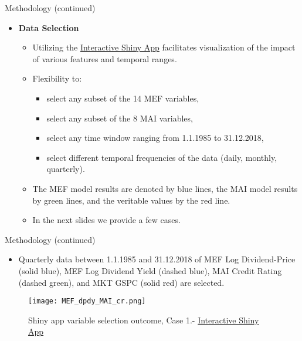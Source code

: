 \documentclass{beamer}
\begin{document}
\begin{frame}{Methodology (continued)}
  \begin{itemize}
    \item \textbf{Data Selection}
    \begin{itemize}
        \item Utilizing the \href{https://baumender11.shinyapps.io/Alpha/}{Interactive Shiny App} facilitates visualization of the impact of various features and temporal ranges.
        \item Flexibility to:
        \begin{itemize}
            \item select any subset of the 14 MEF variables,
            \item select any subset of the 8 MAI variables,
            \item select any time window ranging from 1.1.1985 to 31.12.2018,
            \item select different temporal frequencies of the data (daily, monthly, quarterly).
        \end{itemize}
        \item The MEF model results are denoted by blue lines, the MAI model results by green lines, and the veritable values by the red line.
        \item In the next slides we provide a few cases.
    \end{itemize}
  \end{itemize}
\end{frame}

\begin{frame}{Methodology (continued)}
  \begin{itemize}
    \item Quarterly data between 1.1.1985 and 31.12.2018 of MEF Log Dividend-Price (solid blue), MEF Log Dividend Yield (dashed blue), MAI Credit Rating (dashed green), and MKT GSPC (solid red) are selected.
  \end{itemize}
    \begin{figure}[H]
        \centering
        \begin{minipage}{.80\textwidth}
            \centering
            \texttt{[image: MEF\_dpdy\_MAI\_cr.png]}
            \caption{Shiny app variable selection outcome, Case 1.- \href{https://baumender11.shinyapps.io/Alpha/}{Interactive Shiny App}}
            \label{fig:linear_prediction}
        \end{minipage}
    \end{figure}
\end{frame}
\end{document}
